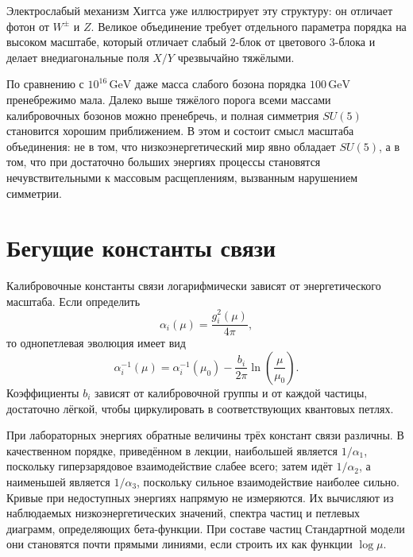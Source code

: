 Электрослабый механизм Хиггса уже иллюстрирует эту структуру: он отличает фотон от \(W^\pm\) и \(Z\). Великое объединение требует отдельного параметра порядка на высоком масштабе, который отличает слабый \(2\)-блок от цветового \(3\)-блока и делает внедиагональные поля \(X/Y\) чрезвычайно тяжёлыми.

По сравнению с \(10^{16}\,\mathrm{GeV}\) даже масса слабого бозона порядка \(100\,\mathrm{GeV}\) пренебрежимо мала. Далеко выше тяжёлого порога всеми массами калибровочных бозонов можно пренебречь, и полная симметрия \(SU(5)\) становится хорошим приближением. В этом и состоит смысл масштаба объединения: не в том, что низкоэнергетический мир явно обладает \(SU(5)\), а в том, что при достаточно больших энергиях процессы становятся нечувствительными к массовым расщеплениям, вызванным нарушением симметрии.

\section{Бегущие константы связи}

Калибровочные константы связи логарифмически зависят от энергетического масштаба. Если определить
\begin{equation}
\alpha_i(\mu)=\frac{g_i^2(\mu)}{4\pi},
\end{equation}
то однопетлевая эволюция имеет вид
\begin{equation}
\alpha_i^{-1}(\mu)
=
\alpha_i^{-1}(\mu_0)
-\frac{b_i}{2\pi}
\ln\!\left(\frac{\mu}{\mu_0}\right).
\label{eq:l10-running}
\end{equation}
Коэффициенты \(b_i\) зависят от калибровочной группы и от каждой частицы, достаточно лёгкой, чтобы циркулировать в соответствующих квантовых петлях.


При лабораторных энергиях обратные величины трёх констант связи различны. В качественном порядке, приведённом в лекции, наибольшей является \(1/\alpha_1\), поскольку гиперзарядовое взаимодействие слабее всего; затем идёт \(1/\alpha_2\), а наименьшей является \(1/\alpha_3\), поскольку сильное взаимодействие наиболее сильно. Кривые при недоступных энергиях напрямую не измеряются. Их вычисляют из наблюдаемых низкоэнергетических значений, спектра частиц и петлевых диаграмм, определяющих бета-функции. При составе частиц Стандартной модели они становятся почти прямыми линиями, если строить их как функции \(\log\mu\).

